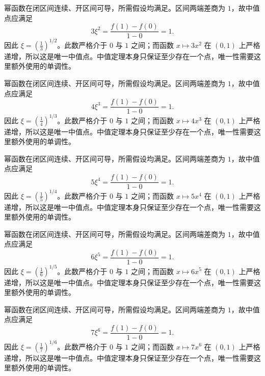 \documentclass[12pt,fontset=fandol]{ctexart}
\begin{document}
\begin{solve}\label{ans:c10q3}
幂函数在闭区间连续、开区间可导，所需假设均满足。区间两端差商为 $1$，故中值点应满足
\[
3\xi^{2}=\frac{f(1)-f(0)}{1-0}=1.
\]
因此 $\xi=(\frac{1}{3})^{1/2}$。此数严格介于 $0$ 与 $1$ 之间；而函数 $x\mapsto 3x^{2}$ 在 $(0,1)$ 上严格递增，所以这是唯一中值点。中值定理本身只保证至少存在一个点，唯一性需要这里额外使用的单调性。
\end{solve}

\begin{solve}\label{ans:c10q4}
幂函数在闭区间连续、开区间可导，所需假设均满足。区间两端差商为 $1$，故中值点应满足
\[
4\xi^{3}=\frac{f(1)-f(0)}{1-0}=1.
\]
因此 $\xi=(\frac{1}{4})^{1/3}$。此数严格介于 $0$ 与 $1$ 之间；而函数 $x\mapsto 4x^{3}$ 在 $(0,1)$ 上严格递增，所以这是唯一中值点。中值定理本身只保证至少存在一个点，唯一性需要这里额外使用的单调性。
\end{solve}

\begin{solve}\label{ans:c10q5}
幂函数在闭区间连续、开区间可导，所需假设均满足。区间两端差商为 $1$，故中值点应满足
\[
5\xi^{4}=\frac{f(1)-f(0)}{1-0}=1.
\]
因此 $\xi=(\frac{1}{5})^{1/4}$。此数严格介于 $0$ 与 $1$ 之间；而函数 $x\mapsto 5x^{4}$ 在 $(0,1)$ 上严格递增，所以这是唯一中值点。中值定理本身只保证至少存在一个点，唯一性需要这里额外使用的单调性。
\end{solve}

\begin{solve}\label{ans:c10q6}
幂函数在闭区间连续、开区间可导，所需假设均满足。区间两端差商为 $1$，故中值点应满足
\[
6\xi^{5}=\frac{f(1)-f(0)}{1-0}=1.
\]
因此 $\xi=(\frac{1}{6})^{1/5}$。此数严格介于 $0$ 与 $1$ 之间；而函数 $x\mapsto 6x^{5}$ 在 $(0,1)$ 上严格递增，所以这是唯一中值点。中值定理本身只保证至少存在一个点，唯一性需要这里额外使用的单调性。
\end{solve}

\begin{solve}\label{ans:c10q7}
幂函数在闭区间连续、开区间可导，所需假设均满足。区间两端差商为 $1$，故中值点应满足
\[
7\xi^{6}=\frac{f(1)-f(0)}{1-0}=1.
\]
因此 $\xi=(\frac{1}{7})^{1/6}$。此数严格介于 $0$ 与 $1$ 之间；而函数 $x\mapsto 7x^{6}$ 在 $(0,1)$ 上严格递增，所以这是唯一中值点。中值定理本身只保证至少存在一个点，唯一性需要这里额外使用的单调性。
\end{solve}
\end{document}
